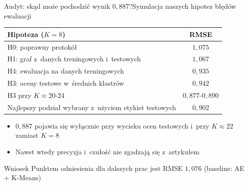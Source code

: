 \documentclass[red]{beamer}
\begin{document}
    \begin{frame}{Audyt: skąd może pochodzić wynik $0{,}887$?}{Symulacja naszych hipotez błędów ewaluacji}
        \begin{center}
            \footnotesize
            \begin{tabular}{lc}
                \toprule
                \textbf{Hipoteza ($K = 8$)} & \textbf{RMSE} \\
                \midrule
                H0: poprawny protokół & $1{,}075$ \\
                H1: graf z~danych treningowych i~testowych & $1{,}067$ \\
                H4: ewaluacja na danych treningowych & $0{,}935$ \\
                H3: oceny testowe w~średnich klastrów & $0{,}942$ \\
                H3 przy $K \approx 20$-$24$ & $0{,}877$-$0{,}890$ \\
                \midrule
                Najlepszy podział wybrany z~użyciem etykiet testowych & $0{,}902$ \\
                \bottomrule
            \end{tabular}
        \end{center}
        \small
        \begin{itemize}
            \item $0{,}887$ pojawia się wyłącznie przy wycieku ocen testowych
                  i~przy $K \approx 22$ zamiast $K = 8$
            \item Nawet wtedy precyzja i~czułość nie zgadzają się z~artykułem
        \end{itemize}
        \begin{block}{Wniosek}
            Punktem odniesienia dla dalszych prac jest RMSE $1{,}076$ (baseline: AE + K-Means)
        \end{block}
    \end{frame}
\end{document}
